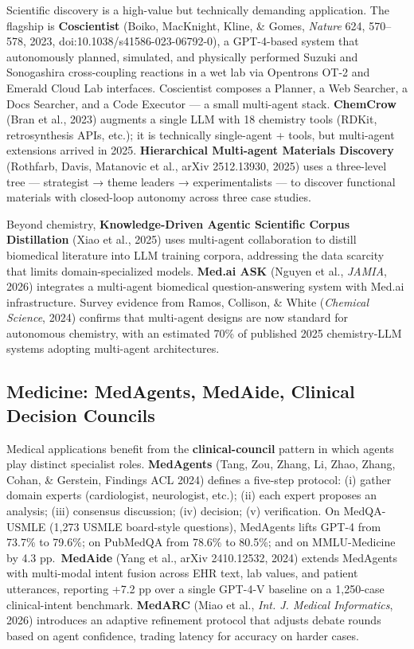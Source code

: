 Scientific discovery is a high-value but technically demanding application. The flagship is \textbf{Coscientist} (Boiko, MacKnight, Kline, \& Gomes, \emph{Nature} 624, 570--578, 2023, doi:10.1038/s41586-023-06792-0), a GPT-4-based system that autonomously planned, simulated, and physically performed Suzuki and Sonogashira cross-coupling reactions in a wet lab via Opentrons OT-2 and Emerald Cloud Lab interfaces. Coscientist composes a Planner, a Web Searcher, a Docs Searcher, and a Code Executor --- a small multi-agent stack. \textbf{ChemCrow} (Bran et al., 2023) augments a single LLM with 18 chemistry tools (RDKit, retrosynthesis APIs, etc.); it is technically single-agent + tools, but multi-agent extensions arrived in 2025. \textbf{Hierarchical Multi-agent Materials Discovery} (Rothfarb, Davis, Matanovic et al., arXiv 2512.13930, 2025) uses a three-level tree --- strategist → theme leaders → experimentalists --- to discover functional materials with closed-loop autonomy across three case studies.

Beyond chemistry, \textbf{Knowledge-Driven Agentic Scientific Corpus Distillation} (Xiao et al., 2025) uses multi-agent collaboration to distill biomedical literature into LLM training corpora, addressing the data scarcity that limits domain-specialized models. \textbf{Med.ai ASK} (Nguyen et al., \emph{JAMIA}, 2026) integrates a multi-agent biomedical question-answering system with Med.ai infrastructure. Survey evidence from Ramos, Collison, \& White (\emph{Chemical Science}, 2024) confirms that multi-agent designs are now standard for autonomous chemistry, with an estimated 70\% of published 2025 chemistry-LLM systems adopting multi-agent architectures.

\subsection{Medicine: MedAgents, MedAide, Clinical Decision Councils}\label{medicine-medagents-medaide-clinical-decision-councils}

Medical applications benefit from the \textbf{clinical-council} pattern in which agents play distinct specialist roles. \textbf{MedAgents} (Tang, Zou, Zhang, Li, Zhao, Zhang, Cohan, \& Gerstein, Findings ACL 2024) defines a five-step protocol: (i) gather domain experts (cardiologist, neurologist, etc.); (ii) each expert proposes an analysis; (iii) consensus discussion; (iv) decision; (v) verification. On MedQA-USMLE (1,273 USMLE board-style questions), MedAgents lifts GPT-4 from 73.7\% to 79.6\%; on PubMedQA from 78.6\% to 80.5\%; and on MMLU-Medicine by 4.3 pp.~\textbf{MedAide} (Yang et al., arXiv 2410.12532, 2024) extends MedAgents with multi-modal intent fusion across EHR text, lab values, and patient utterances, reporting +7.2 pp over a single GPT-4-V baseline on a 1,250-case clinical-intent benchmark. \textbf{MedARC} (Miao et al., \emph{Int. J. Medical Informatics}, 2026) introduces an adaptive refinement protocol that adjusts debate rounds based on agent confidence, trading latency for accuracy on harder cases.

